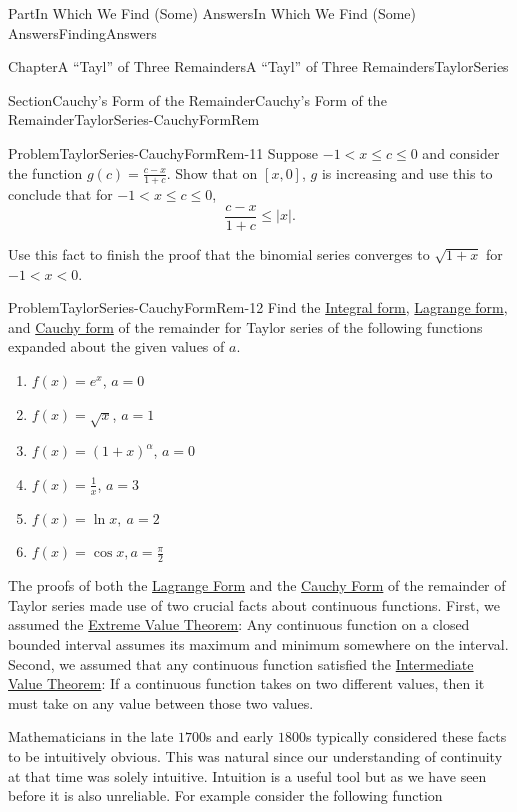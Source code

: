 \documentclass[oneside,10pt,]{book}
\numberwithin{equation}{part}
\newcommand{\lt}{<}
\begin{document}
\begin{partptx}{Part}{In Which We Find (Some) Answers}{}{In Which We Find (Some) Answers}{}{}{FindingAnswers}
\begin{chapterptx}{Chapter}{A ``Tayl'' of Three Remainders}{}{A ``Tayl'' of Three Remainders}{}{}{TaylorSeries}
\begin{sectionptx}{Section}{Cauchy's Form of the Remainder}{}{Cauchy's Form of the Remainder}{}{}{TaylorSeries-CauchyFormRem}
\begin{problem}{Problem}{}{TaylorSeries-CauchyFormRem-11}
Suppose \(-1\lt x\leq c\leq 0\) and consider the function \(g(c)=\frac{c-x}{1+c}\). Show that on \([x,0]\), \(g\) is increasing and use this to conclude that for \(-1\lt x\leq c\leq 0\),%
\begin{equation*}
\frac{c-x}{1+c}\leq|x|\text{.}
\end{equation*}
%
\par
Use this fact to finish the proof that the binomial series converges to \(\sqrt{1+x}\) for \(-1\lt x\lt 0\).%
\end{problem}
\begin{problem}{Problem}{}{TaylorSeries-CauchyFormRem-12}%
Find the \hyperref[EQUATIONIntFormRemainder]{Integral form}, \hyperref[EQUATIONLagFormRemainder]{Lagrange form}, and \hyperref[EQUATIONCauchyFormRemainder]{Cauchy form} of the remainder for Taylor series of the following functions expanded about the given values of \(a\).%
\begin{enumerate}[font=\bfseries,label=(\alph*),ref=\alph*]%
\item{}\(f(x)=e^x\), \(a=0\)%
\item{}\(f(x)=\sqrt{x}\), \(a=1\)%
\item{}\(f(x)=(1+x)^\alpha\), \(a=0\)%
\item{}\(f(x)=\frac{1}{x}\), \(a=3\)%
\item{}\(f(x)=\ln x,\ a=2\)%
\item{}\(f(x)=\cos x, a=\frac{\pi}{2}\)%
\end{enumerate}%
\end{problem}
The proofs of both the \hyperref[thm_LagrangeRemainder]{Lagrange Form} and the \hyperref[thm_CauchyRemainder]{Cauchy Form} of the remainder of Taylor series made use of two crucial facts about continuous functions.  First, we assumed the \hyperref[thm_EVT]{Extreme Value Theorem}: Any continuous function on a closed bounded interval assumes its maximum and minimum somewhere on the interval.  Second, we assumed that any continuous function satisfied the \hyperref[IntermediateValueTheorem]{Intermediate Value Theorem}: If a continuous function takes on two different values, then it must take on any value between those two values.%
\par
Mathematicians in the late \(1700\)s and early \(1800\)s typically considered these facts to be intuitively obvious. This was natural since our understanding of continuity at that time was solely intuitive.  Intuition is a useful tool but as we have seen before it is also unreliable.  For example consider the following function%
\begin{align}

\end{align}
\end{sectionptx}
\end{chapterptx}
\end{partptx}
\end{document}

